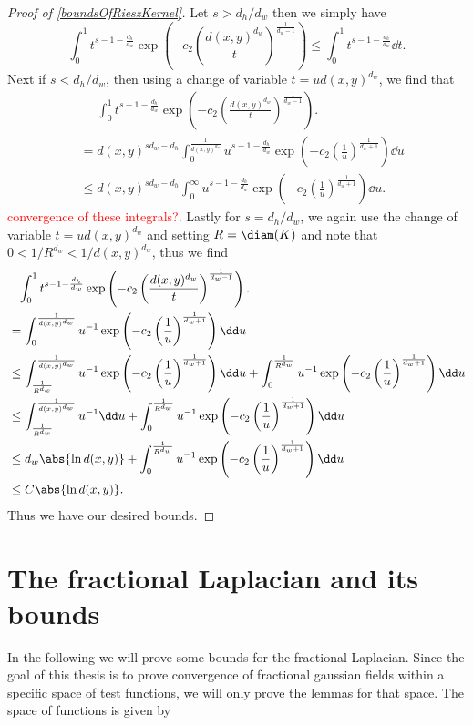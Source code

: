 \begin{proof}[Proof of \cref{boundsOfRieszKernel}]
	Let $s > d_h/d_w$ then we simply have 
	\begin{equation}
		\int_{0}^{1} t^{s-1-\frac{d_h}{d_w}} \exp\left(-c_2 \left(\frac{d(x,y)^{d_w}}{t}\right)^{\frac{1}{d_w -1}}\right) \leq \int_{0}^{1}t^{s-1-\frac{d_h}{d_w}} \dd t.
	\end{equation}
	Next if $s < d_h/d_w$, then using a change of variable $t = u d(x,y)^{d_w}$, we find that
	\begin{align}
		&\phantom{=}\int_{0}^{1} t^{s-1-\frac{d_h}{d_w}} \exp\left(-c_2 \left(\frac{d(x,y)^{d_w}}{t}\right)^{\frac{1}{d_w -1}}\right). \\
		&=d(x,y)^{sd_w - d_h} \int_{0}^{\frac{1}{d(x,y)^{d_w}}} u^{s-1-\frac{d_h}{d_w}} \exp\left(-c_2 \left(\frac{1}{u}\right)^{\frac{1}{d_w+1}}\right) \dd u \\
		&\leq d(x,y)^{sd_w-d_h} \int_{0}^{\infty} u^{s-1-\frac{d_h}{d_w}} \exp\left(-c_2 \left(\frac{1}{u}\right)^{\frac{1}{d_w+1}}\right) \dd u.
	\end{align}
	\textcolor{red}{convergence of these integrals?}. Lastly for $s = d_h/d_w$, we again use the change of variable $t = ud(x,y)^{d_w}$ and setting $R = \diam(K)$ and note that $0 < 1/R^{d_w} < 1/d(x,y)^{d_w}$, thus we find
	\begin{align}
		&\phantom{=}\int_{0}^{1} t^{s-1-\frac{d_h}{d_w}} \exp\left(-c_2 \left(\frac{d(x,y)^{d_w}}{t}\right)^{\frac{1}{d_w -1}}\right). \\
		&=\int_{0}^{\frac{1}{d(x,y)^{d_w}}} u^{-1} \exp\left(-c_2 \left(\frac{1}{u}\right)^{\frac{1}{d_w+1}}\right) \dd u \\
		&\leq \int_{\frac{1}{R^{d_w}}}^{\frac{1}{d(x,y)^{d_w}}} u^{-1} \exp\left(-c_2 \left(\frac{1}{u}\right)^{\frac{1}{d_w+1}}\right) \dd u + \int_{0}^{\frac{1}{R^{d_w}}} u^{-1} \exp\left(-c_2 \left(\frac{1}{u}\right)^{\frac{1}{d_w+1}}\right) \dd u  \\
		&\leq \int_{\frac{1}{R^{d_w}}}^{\frac{1}{d(x,y)^{d_w}}} u^{-1} \dd u + \int_{0}^{\frac{1}{R^{d_w}}} u^{-1} \exp\left(-c_2\left(\frac{1}{u}\right)^{\frac{1}{d_w+1}}\right) \dd u  \\
		& \leq d_w \abs{\ln d(x,y)} +\int_{0}^{\frac{1}{R^{d_w}}} u^{-1} \exp\left(-c_2\left(\frac{1}{u}\right)^{\frac{1}{d_w+1}}\right) \dd u \\
		& \leq C \abs{\ln d(x,y)}.
	\end{align}
	Thus we have our desired bounds.
\end{proof}

\section{The fractional Laplacian and its bounds}
In the following we will prove some bounds for the fractional Laplacian. Since the goal of this thesis is to prove convergence of fractional gaussian fields within a specific space of test functions, we will only prove the lemmas for that space. The space of functions is given by

